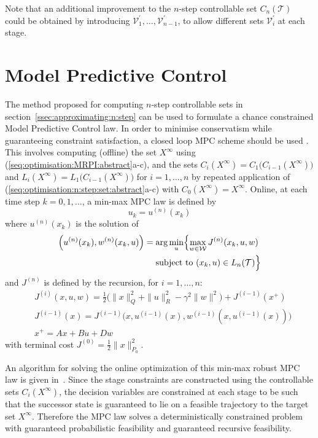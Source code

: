 \documentclass{ifacconf}
\providecommand{\W}{\mathcal W}
\providecommand{\V}{\mathcal V}
\providecommand{\T}{\mathcal T}
\begin{document}
Note that an additional improvement to the $n$-step controllable set $C_n(\T)$ could be obtained by introducing $\V_1^\prime,\dots,\V_{n-1}^\prime$, to allow different sets $\V_i^\prime$ at each stage.

\section{Model Predictive Control}\label{ssec:mpc}

The method proposed for computing $n$-step controllable sets in section~\ref{ssec:approximating:n:step} can be used to formulate a chance constrained Model Predictive Control law. In order to minimise conservatism while guaranteeing constraint satisfaction, a closed loop MPC scheme should be used \citep[see e.g.][]{Lee:1997}.
This involves computing (offline) the set $X^\infty$ using \mbox{(\ref{seq:optimisation:MRPI:abstract}a-c)}, and the 
sets $C_{i}(X^\infty) = C_1\bigl(C_{i-1}(X^\infty)\bigr)$ and $L_{i}(X^\infty) = L_1\bigl(C_{i-1}(X^\infty)\bigr)$ 
for $i=1,\ldots,n$ by repeated application of (\ref{seq:optimisation:n:step:set:abstract}a-c) with $C_0(X^\infty)= X^\infty$.
Online, at each time step $k=0,1,\ldots$, a min-max MPC law is defined by 
\[
u_k = u^{(n)}(x_k)
\]
where $u^{(n)}(x_k)$ is the solution of
%
\[%
\begin{aligned}
\Bigl( u^{(n)} (x_k) , w^{(n)} (x_k,u) \Bigr) &= \arg \min_{u} \Bigl\{ \max_{w\in\W} J^{(n)}(x_k,u,w)  
\\
&\ \quad \text{subject to}\ (x_k, u) \in L_n(\T)
\Bigr\}
\end{aligned}
\]%
and $J^{(n)}$ is defined by the recursion, for $i=1,\ldots,n$:
\begin{align*}
&J^{(i)}(x,u,w) = \tfrac{1}{2}\bigl( \| x \|^2_Q + \| u \|^2_R -
\gamma^2 \| w \|^2\bigr) + J^{(i-1)}(x^+) 
\\
&J^{(i-1)}(x) = J^{(i-1)}\bigl(x,u^{(i-1)}(x),w^{(i-1)}(x,u^{(i-1)}(x))\bigr) \\
&x^+ = Ax + Bu + Dw
\end{align*}
with terminal cost $J^{(0)} = \frac{1}{2}\|x\|_{P_0}^2$.

An algorithm for solving the online optimization of this min-max robust MPC law is given in~\citet{Buerger2016}. 
%
Since the stage constraints are constructed using the controllable sets $C_{i}(X^\infty)$, the decision variables are constrained at each stage to be such that the successor state is guaranteed to lie on a feasible trajectory to the target set $X^\infty$. Therefore the MPC law solves a deterministically constrained problem with guaranteed probabilistic feasibility and guaranteed recursive feasibility.
\end{document}
